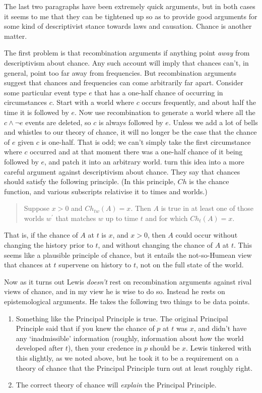 The last two paragraphs have been extremely quick arguments, but in both cases it seems to me that they can be tightened up so as to provide good arguments for some kind of descriptivist stance towards laws and causation. Chance is another matter.

The first problem is that recombination arguments if anything point \textit{away} from descriptivism about chance. Any such account will imply that chances can't, in general, point too far away from frequencies. But recombination arguments suggest that chances and frequencies can come arbitrarily far apart. Consider some particular event type $e$ that has a one-half chance of occurring in circumstances $c$. Start with a world where $c$ occurs frequently, and about half the time it is followed by $e$. Now use recombination to generate a world where all the $c \wedge \neg e$ events are deleted, so $c$ is always followed by $e$. Unless we add a lot of bells and whistles to our theory of chance, it will no longer be the case that the chance of $e$ given $c$ is one-half. That is odd; we can't simply take the first circumstance where $c$ occurred and at that moment there was a one-half chance of it being followed by $e$, and patch it into an arbitrary world. \citet{BigelowCollinsPargetter} turn this idea into a more careful argument against descriptivism about chance. They say that chances should satisfy the following principle. (In this principle, $Ch$ is the chance function, and various subscripts relativise it to times and worlds.)

\begin{quote}
Suppose $x > 0$ and $Ch_{tw}(A) = x$. Then $A$ is true in at least one of those worlds $w^{\prime}$ that matches $w$ up to time $t$ and for which $Ch_t(A) = x$. \citep[459]{BigelowCollinsPargetter}
\end{quote}

\noindent That is, if the chance of $A$ at $t$ is $x$, and $x > 0$, then $A$ could occur without changing the history prior to $t$, and without changing the chance of $A$ at $t$. This seems like a plausible principle of chance, but it entails the not-so-Humean view that chances at $t$ supervene on history to $t$, not on the full state of the world.

Now as it turns out Lewis \textit{doesn't} rest on recombination arguments against rival views of chance, and in my view he is wise to do so. Instead he rests on epistemological arguments. He takes the following two things to be data points.

\begin{enumerate}
\item Something like the Principal Principle is true. The original Principal Principle said that if you knew the chance of $p$ at $t$ was $x$, and didn't have any `inadmissible' information (roughly, information about how the world developed after $t$), then your credence in $p$ should be $x$. Lewis tinkered with this slightly, as we noted above, but he took it to be a requirement on a theory of chance that the Principal Principle turn out at least roughly right.
\item The correct theory of chance will \textit{explain} the Principal Principle.
\end{enumerate}

